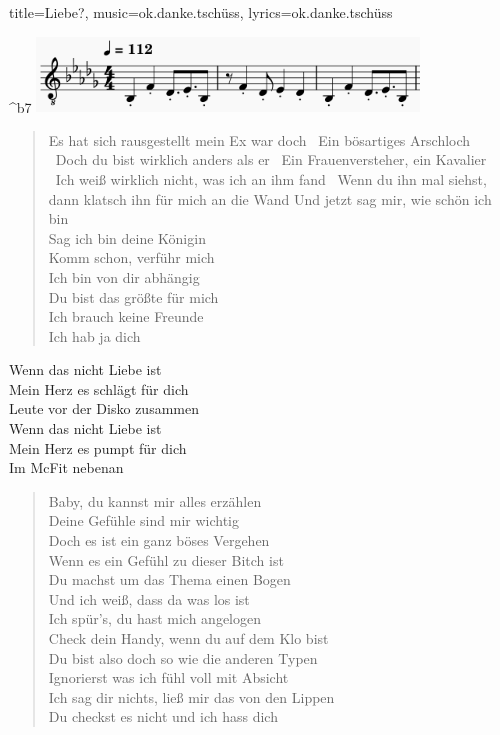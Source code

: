 \newpage
\begin{song}{title={Liebe?}, music={ok.danke.tschüss}, lyrics={ok.danke.tschüss}}
\small
\begin{intro}
    ^{b7}
    \newline
    \includegraphics[height=2cm]{images/ok-danke-tschuess-intro.png}
\end{intro}

\begin{verse}
    Es hat sich rausgestellt mein Ex war doch \
    Ein bösartiges Arschloch \
    Doch du bist wirklich anders als er \
    Ein Frauenversteher, ein Kavalier \
    Ich weiß wirklich nicht, was ich an ihm fand \
    Wenn du ihn mal siehst, dann klatsch ihn für mich an die Wand
    Und jetzt sag mir, wie schön ich bin \\
    Sag ich bin deine Königin \\
    Komm schon, verführ mich \\
    Ich bin von dir abhängig \\
    Du bist das größte für mich \\
    Ich brauch keine Freunde \\
    Ich hab ja dich
\end{verse}

\begin{chorus}
    Wenn das nicht Liebe ist \\
    Mein Herz es schlägt für dich \\
    Leute vor der Disko zusammen \\
    Wenn das nicht Liebe ist \\
    Mein Herz es pumpt für dich \\
    Im McFit nebenan
\end{chorus}

\begin{verse}
    Baby, du kannst mir alles erzählen \\
    Deine Gefühle sind mir wichtig \\
    Doch es ist ein ganz böses Vergehen \\
    Wenn es ein Gefühl zu dieser Bitch ist \\
    Du machst um das Thema einen Bogen \\
    Und ich weiß, dass da was los ist \\
    Ich spür's, du hast mich angelogen \\
    Check dein Handy, wenn du auf dem Klo bist \\
    Du bist also doch so wie die anderen Typen \\
    Ignorierst was ich fühl voll mit Absicht \\
    Ich sag dir nichts, ließ mir das von den Lippen \\
    Du checkst es nicht und ich hass dich
\end{verse}


\end{song}
